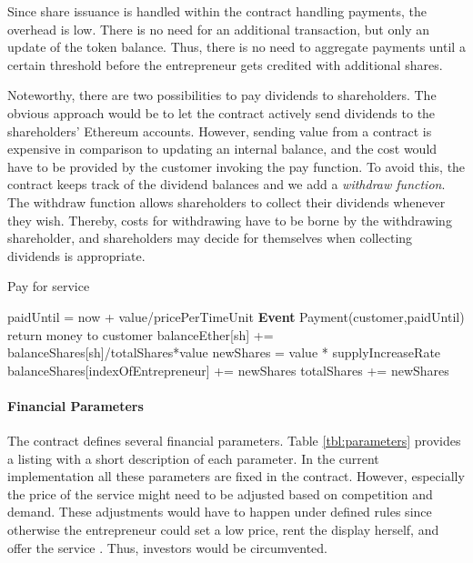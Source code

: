 Since share issuance is handled within the contract handling payments, the overhead is low. There is no need for an additional transaction, but only an update of the token balance. Thus, there is no need to aggregate payments until a certain threshold before the entrepreneur gets credited with additional shares. 

Noteworthy, there are two possibilities to pay dividends to shareholders. The obvious approach would be to let the contract actively send dividends to the shareholders' Ethereum accounts. However, sending value from a contract is expensive in comparison to updating an internal balance, and the cost would have to be provided by the customer invoking the pay function. To avoid this, the contract keeps track of the dividend balances and we add a \emph{withdraw function}. The withdraw function allows shareholders to collect their dividends whenever they wish. Thereby, costs for withdrawing have to be borne by the withdrawing shareholder, and shareholders may decide for themselves when collecting dividends is appropriate. 

\begin{algorithm}[!t]
   \caption{Pay for service}
    \begin{algorithmic}[1]
      \State {}
      \State {}
      \State paidUntil = now + value/pricePerTimeUnit
      \State \textbf{Event} Payment(customer,paidUntil)
      \Else 
      \State return money to customer
      \EndIf
      \Statex
      \State balanceEther[sh] += balanceShares[sh]/totalShares*value
      \EndFor
      \EndFunction
      \Statex
      \State newShares = value * supplyIncreaseRate
      \State balanceShares[indexOfEntrepreneur] += newShares
      \State totalShares += newShares
      \EndFunction
\end{algorithmic}
\label{alg:payforservice}
\end{algorithm}

\paragraph{Financial Parameters}

The contract defines several financial parameters. Table \ref{tbl:parameters} provides a listing with a short description of each parameter. In the current implementation all these parameters are fixed in the contract. However, especially the price of the service might need to be adjusted based on competition and demand. These adjustments would have to happen under defined rules since otherwise the entrepreneur could set a low price, rent the display herself, and offer the service . Thus, investors would be circumvented.

